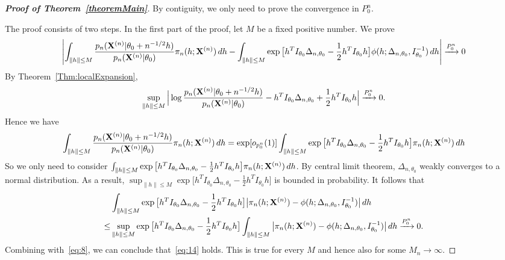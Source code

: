 \documentclass[3p]{elsarticle}
\theoremstyle{plain}
\theoremstyle{definition}
\theoremstyle{remark}
\begin{document}
\begin{proof}[\textbf{Proof of Theorem~\ref{theoremMain}}]
    By contiguity, we only need to prove the convergence in $P_0^n$.

The proof consists of two steps. In the first part of the proof, let  $M$ be a fixed positive number. We prove
\begin{equation}\label{eq:14}
    \left|\int_{\|h\|\leq M} \frac{p_n(\mathbf{X}^{(n)}|\theta_0+n^{-1/2}h)}{p_n(\mathbf{X}^{(n)}|\theta_0)}\pi_n (h;\mathbf{X}^{(n)}) \, dh-\int_{\|h\|\leq M} \exp\big[h^T I_{\theta_0}\Delta_{n,\theta_0}-\frac{1}{2}h^T I_{\theta_0}h\big] \phi(h;\Delta_{n,\theta_0},I_{\theta_0}^{-1})\, dh\right|
 \xrightarrow{P^n_0}0
\end{equation}
By Theorem~\ref{Thm:localExpansion},
\begin{equation*}
    \sup_{\|h\|\leq M}\Big|\log \frac{p_n(\mathbf{X}^{(n)}|\theta_0+n^{-1/2}h)}{p_n(\mathbf{X}^{(n)}|\theta_0)}-h^T I_{\theta_0}\Delta_{n,\theta_0}+\frac{1}{2}h^T I_{\theta_0}h \Big|\xrightarrow{P_0^n}0 .
\end{equation*}
Hence we have
\begin{equation}\label{eq:8}
    \int_{\|h\|\leq M} \frac{p_n(\mathbf{X}^{(n)}|\theta_0+n^{-1/2}h)}{p_n(\mathbf{X}^{(n)}|\theta_0)}\pi_n (h;\mathbf{X}^{(n)}) \, dh=
    \exp [o_{p^n_0}(1)]\int_{\|h\|\leq M} \exp\big[h^T I_{\theta_0}\Delta_{n,\theta_0}-\frac{1}{2}h^T I_{\theta_0}h\big]\pi_n (h;\mathbf{X}^{(n)}) \, dh
\end{equation}
    So we only need to consider $\int_{\|h\|\leq M} \exp\big[h^T I_{\theta_0}\Delta_{n,\theta_0}-\frac{1}{2}h^T I_{\theta_0}h\big]\pi_n (h;\mathbf{X}^{(n)}) \, dh$.
    By central limit theorem, $\Delta_{n,\theta_0}$ weakly converges to a normal distribution.
    As a result, $\sup_{\|h\|\leq M}\exp\big[h^T I_{\theta_0}\Delta_{n,\theta_0}-\frac{1}{2}h^T I_{\theta_0}h\big]$ is bounded in probability.
    It follows that
\begin{equation*}
\begin{aligned}
    &\int_{\|h\|\leq M} \exp\big[h^T I_{\theta_0}\Delta_{n,\theta_0}-\frac{1}{2}h^T I_{\theta_0}h\big] \big|\pi_n (h;\mathbf{X}^{(n)})-\phi(h;\Delta_{n,\theta_0},I_{\theta_0}^{-1})\big|\, dh
\\
    \leq& \sup_{\|h\|\leq M}\exp\big[h^T I_{\theta_0}\Delta_{n,\theta_0}-\frac{1}{2}h^T I_{\theta_0}h\big] 
    \int_{\|h\|\leq M}
    \big|\pi_n (h;\mathbf{X}^{(n)})-\phi(h;\Delta_{n,\theta_0},I_{\theta_0}^{-1})\big|\, dh
    \xrightarrow{P^n_0}0.
\end{aligned}
\end{equation*}
Combining with~\eqref{eq:8}, we can conclude that~\eqref{eq:14} holds. 
This is true for every $M$ and hence also for some $M_n\to \infty$.


\end{proof}
\end{document}
